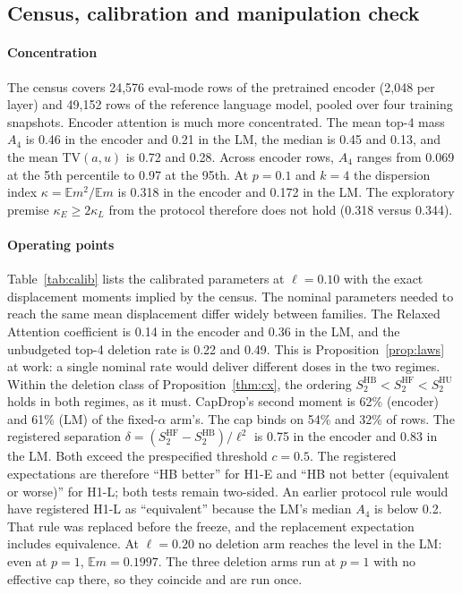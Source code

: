 \subsection{Census, calibration and manipulation check}\label{sec:census}

\paragraph{Concentration}
The census covers 24{,}576 eval-mode rows of the pretrained encoder (2{,}048 per layer) and 49{,}152 rows of
the reference language model, pooled over four training snapshots. Encoder attention is much more
concentrated. The mean top-4 mass $A_4$ is 0.46 in the encoder and 0.21 in the LM, the median is 0.45 and 0.13,
and the mean $\mathrm{TV}(a,u)$ is 0.72 and 0.28. Across encoder rows, $A_4$ ranges from 0.069 at the 5th
percentile to 0.97 at the 95th. At $p=0.1$ and $k=4$ the dispersion index $\kappa=\mathbb E m^2/\mathbb E m$ is
0.318 in the encoder and 0.172 in the LM. The exploratory premise $\kappa_E\ge2\kappa_L$ from the protocol
therefore does not hold (0.318 versus 0.344).

\paragraph{Operating points}
Table~\ref{tab:calib} lists the calibrated parameters at $\ell=0.10$ with the exact displacement moments
implied by the census. The nominal parameters needed to reach the same mean displacement differ widely
between families. The Relaxed Attention coefficient is 0.14 in the encoder and 0.36 in the LM, and the
unbudgeted top-4 deletion rate is 0.22 and 0.49. This is Proposition~\ref{prop:laws} at work: a single nominal
rate would deliver different doses in the two regimes. Within the deletion class of
Proposition~\ref{thm:cx}, the ordering $S_2^{\mathrm{HB}}<S_2^{\mathrm{HF}}<S_2^{\mathrm{HU}}$ holds in both
regimes, as it must. CapDrop's second moment is 62\% (encoder) and 61\% (LM) of the fixed-$\alpha$ arm's. The cap binds on 54\% and 32\% of rows. The registered separation
$\delta=(S_2^{\mathrm{HF}}-S_2^{\mathrm{HB}})/\ell^2$ is 0.75 in the encoder and 0.83 in the LM. Both exceed the
prespecified threshold $c=0.5$. The registered expectations are therefore ``HB better'' for H1-E and ``HB not better
(equivalent or worse)'' for H1-L; both tests remain two-sided. An earlier protocol rule would have
registered H1-L as ``equivalent'' because the LM's median $A_4$ is below 0.2. That rule was replaced before the
freeze, and the replacement expectation includes equivalence. At $\ell=0.20$ no deletion arm reaches the level in the LM:
even at $p=1$, $\mathbb E m=0.1997$. The three deletion arms run at $p=1$ with no effective cap there, so they coincide and are run once.

